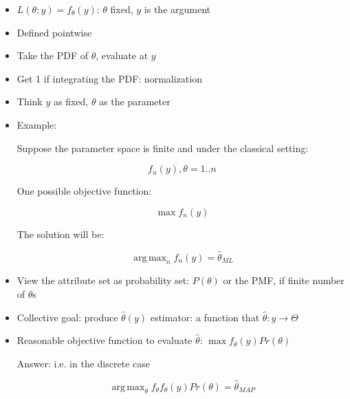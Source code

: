 \documentclass[11pt,letterpaper,titlepage]{article}
\DeclareMathOperator*{\argmax}{arg\,max}
\begin{document}
\begin{itemize}
    
    \item $L(\theta; y) = f_{\theta}(y)$: $\theta$ fixed, $y$ is the argument
    
    \item Defined pointwise
    
    \item Take the PDF of $\theta$, evaluate at $y$
    
    \item Get 1 if integrating the PDF: normalization
    
    \item Think $y$ as fixed, $\theta$ as the parameter
    
    \item Example:
    
    Suppose the parameter space is finite and under the classical setting:
    
    \begin{equation*}
        f_n(y), \theta = 1..n
    \end{equation*}
    
    One possible objective function:
    
    \begin{equation*}
        \max f_n(y)
    \end{equation*}
    
    The solution will be:
    
    \begin{equation*}
        \argmax_{n} f_n(y) = \hat{\theta}_{ML}
    \end{equation*}
    
    \item View the attribute set as probability set: $P(\theta)$ or the PMF, if finite number of $\theta$s
    
    \item Collective goal: produce $\hat{\theta}(y)$ estimator: a function that $\hat{\theta}: y \rightarrow \Theta$
    
    \item Reasonable objective function to evaluate $\hat{\theta}$: $\max f_{\theta}(y) Pr(\theta)$
    
    Answer: i.e. in the discrete case
    
    \begin{equation*}
        \argmax_{\theta} f_{\theta} f_{\theta}(y) Pr(\theta) = \hat{\theta}_{MAP}
    \end{equation*}
    

\end{itemize}
\end{document}
